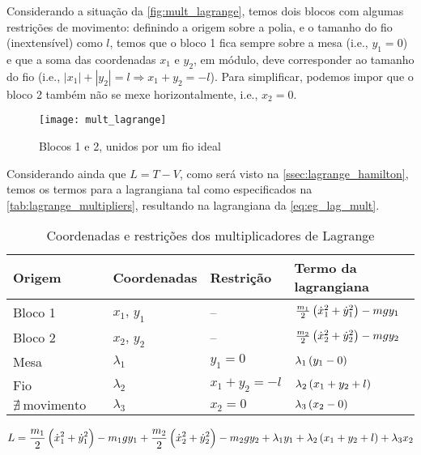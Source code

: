 \begin{eg}
    \FloatBarrier
    Considerando a situação da \autoref{fig:mult_lagrange}, temos dois blocos
    com algumas restrições de movimento: definindo a origem sobre a polia, e o
    tamanho do fio (inextensível) como $l$, temos que o bloco 1 fica sempre
    sobre a mesa (i.e., $y_1 = 0$) e que a soma das coordenadas $x_1$ e $y_2$,
    em módulo, deve corresponder ao tamanho do fio (i.e., $|x_1| + |y_2| = l
    \Rightarrow x_1 + y_2 = -l$). Para simplificar, podemos impor que o bloco 2
    também não se mexe horizontalmente, i.e., $x_2 = 0$.

    \begin{figure}[ht]
        \centering
        \texttt{[image: mult\_lagrange]}
        \caption{Blocos 1 e 2, unidos por um fio ideal}
        \label{fig:mult_lagrange}
    \end{figure}
    \FloatBarrier

    Considerando ainda que $L = T - V$, como será visto na
    \autoref{ssec:lagrange_hamilton}, temos os termos para a lagrangiana tal
    como especificados na \autoref{tab:lagrange_multipliers}, resultando na
    lagrangiana da \autoref{eq:eg_lag_mult}.

    \begin{table}[H]
        \centering
        \begin{tabularx}{\textwidth}{lllX}
            \toprule
            Origem & Coordenadas & Restrição & Termo da lagrangiana \\
            \midrule
            Bloco 1 & $x_1$, $y_1$ & -- & %
                $\frac{m_1}{2} \del{{\dot x_1}^2 + {\dot y_1}^2} - mgy_1$ \\
            Bloco 2 & $x_2$, $y_2$ & -- & %
                $\frac{m_2}{2} \del{{\dot x_2}^2 + {\dot y_2}^2} - mgy_2$ \\
            Mesa & $\lambda_1$ & $y_1 = 0$ & %
                $\lambda_1 \del{y_1 - 0}$ \\
            Fio & $\lambda_2$ & $x_1 + y_2 = -l$ &%
                $\lambda_2 \del{x_1 + y_2 + l}$ \\
            $\nexists~\text{movimento horizontal}$ & $\lambda_3$ & $x_2 = 0$ & %
                $\lambda_3 \del{x_2 - 0}$ \\
            \bottomrule
        \end{tabularx}
        \caption{Coordenadas e restrições dos multiplicadores de Lagrange}
        \label{tab:lagrange_multipliers}
    \end{table}
    
    \begin{equation}
        \label{eq:eg_lag_mult}
        L = \frac{m_1}{2} \del{{\dot x_1}^2 + {\dot y_1}^2} - m_1gy_1 + %
            \frac{m_2}{2} \del{{\dot x_2}^2 + {\dot y_2}^2} - m_2gy_2 + %
            \lambda_1 y_1 + %
            \lambda_2 \del{x_1 + y_2 + l} + %
            \lambda_3 x_2 
    \end{equation}
\end{eg}

